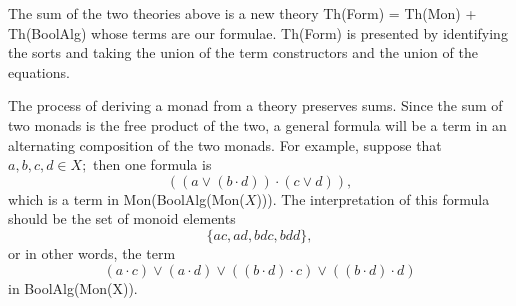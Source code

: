 \documentclass{llncs}
\newcommand{\maps}{\colon}
\begin{document}
The sum of the two theories above is a new theory Th(Form) = Th(Mon) + Th(BoolAlg) whose terms are our formulae.  Th(Form) is presented by identifying the sorts and taking the union of the term constructors and the union of the equations.
\begin{comment}
  \begin{longtable}{|p{0.3\linewidth}|p{0.7\linewidth}|}
    \hline
    Sorts:
    \begin{itemize}
      \item $S$
    \end{itemize}
    Term constructors:
    \begin{itemize}
      \item $\cdot\maps S^2 \to S$
      \item $e\maps 1 \to S$
      \item $\land, \lor\maps S^2 \to S$
      \item $\top, \bot\maps 1 \to S$
      \item $\neg\maps S \to S$
    \end{itemize}
    &
    Equations:
    \begin{itemize}
      \item associativity and unit laws for $\cdot$
      \item \raggedright associativity, commutativity, and unit laws for $\land$ and $\lor$
      \item involution for $\neg$
      \item de Morgan's laws
    \end{itemize}\\
    \hline
  \end{longtable}
\end{comment}

The process of deriving a monad from a theory preserves sums.  Since the sum of two monads is the free product of the two, a general formula will be a term in an alternating composition of the two monads.  For example, suppose that $a, b, c, d \in X;$ then one formula is
\[ (({a}\lor{(b \cdot d)}) \cdot ({c}\lor{d})), \]
which is a term in Mon(BoolAlg(Mon($X$))).  The interpretation of this formula should be the set of monoid elements
\[ \{ ac, ad, bdc, bdd \}, \]
or in other words, the term
\[ (a \cdot c) \lor (a \cdot d) \lor ((b \cdot d) \cdot c) \lor ((b \cdot d) \cdot d) \]
in BoolAlg(Mon(X)).
\end{document}
